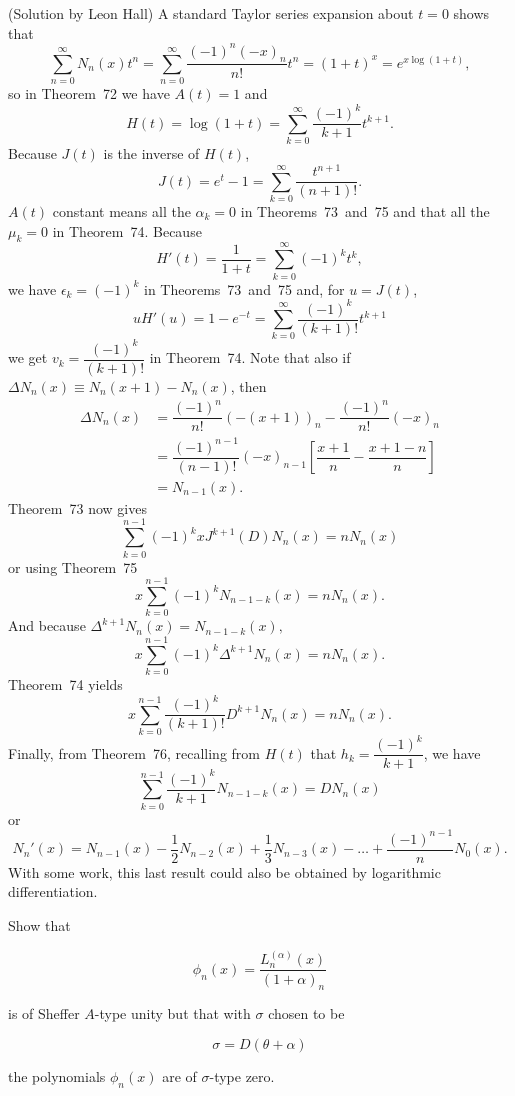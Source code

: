 \begin{solution}(Solution by Leon Hall)
A standard Taylor series expansion about $t=0$ shows that
$$\displaystyle\sum_{n=0}^{\infty} N_n(x)t^n = \displaystyle\sum_{n=0}^{\infty} \dfrac{(-1)^n (-x)_n}{n!} t^n = (1+t)^x=e^{x\log(1+t)},$$
so in Theorem~72 we have $A(t)=1$ and
$$H(t)=\log(1+t) = \displaystyle\sum_{k=0}^{\infty} \dfrac{(-1)^k}{k+1} t^{k+1}.$$
Because $J(t)$ is the inverse of $H(t)$,
$$J(t) = e^t-1 = \displaystyle\sum_{k=0}^{\infty} \dfrac{t^{n+1}}{(n+1)!}.$$
$A(t)$ constant means all the $\alpha_k=0$ in Theorems~73~and~75 and that all the $\mu_k=0$ in Theorem~74. Because
$$H'(t) = \dfrac{1}{1+t} = \displaystyle\sum_{k=0}^{\infty} (-1)^k t^k,$$
we have $\epsilon_k = (-1)^k$ in Theorems~73~and~75 and, for $u=J(t)$,
$$uH'(u)=1-e^{-t}=\displaystyle\sum_{k=0}^{\infty} \dfrac{(-1)^k}{(k+1)!} t^{k+1}$$
we get $v_k=\dfrac{(-1)^k}{(k+1)!}$ in Theorem~74. Note that also if $\Delta N_n(x) \equiv N_n(x+1)-N_n(x)$, then
$$\begin{array}{ll}
\Delta N_n(x) &= \dfrac{(-1)^n}{n!} (-(x+1))_n - \dfrac{(-1)^n}{n!} (-x)_n \\
&= \dfrac{(-1)^{n-1}}{(n-1)!} (-x)_{n-1} \left[ \dfrac{x+1}{n} - \dfrac{x+1-n}{n} \right] \\
&= N_{n-1}(x).
\end{array}$$
Theorem~73 now gives
$$\displaystyle\sum_{k=0}^{n-1} (-1)^k x J^{k+1}(D) N_n(x) = nN_n(x)$$
or using Theorem~75
$$x \displaystyle\sum_{k=0}^{n-1} (-1)^k N_{n-1-k}(x) = nN_n(x).$$
And because $\Delta^{k+1}N_n(x) = N_{n-1-k}(x),$
$$x\displaystyle\sum_{k=0}^{n-1} (-1)^k \Delta^{k+1} N_n(x) = nN_n(x).$$
Theorem~74 yields
$$x\displaystyle\sum_{k=0}^{n-1} \dfrac{(-1)^k}{(k+1)!} D^{k+1} N_n(x) = nN_n(x).$$
Finally, from Theorem~76, recalling from $H(t)$ that $h_k=\dfrac{(-1)^k}{k+1}$, we have
$$\displaystyle\sum_{k=0}^{n-1} \dfrac{(-1)^k}{k+1} N_{n-1-k}(x) = DN_n(x)$$
or
$$N_n'(x)=N_{n-1}(x)-\dfrac{1}{2} N_{n-2}(x)+\dfrac{1}{3}N_{n-3}(x) - \ldots + \dfrac{(-1)^{n-1}}{n} N_0(x).$$
With some work, this last result could also be obtained by logarithmic differentiation.
\end{solution}
\begin{problem}\label{problem6chapter13}
Show that

$$\phi_n(x) = \dfrac{L_n^{(\alpha)}(x)}{(1+\alpha)_n}$$

is of Sheffer $A$-type unity but that with $\sigma$ chosen to be

$$\sigma = D(\theta + \alpha)$$

the polynomials $\phi_n(x)$ are of $\sigma$-type zero.
\end{problem}

